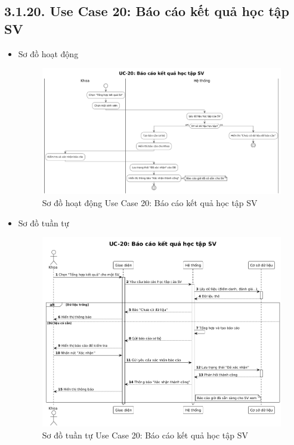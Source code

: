 \subsection*{3.1.20. Use Case 20: Báo cáo kết quả học tập SV}
\begin{itemize}
    \item Sơ đồ hoạt động
    \begin{figure}[H]
    \centering
    \includegraphics[scale=0.35 ]{Picture/ACUC20.png}
    \caption{Sơ đồ hoạt động Use Case 20: Báo cáo kết quả học tập SV}
    \end{figure}
    \item Sơ đồ tuần tự
    \begin{figure}[H]
    \centering
    \includegraphics[scale=0.4 ]{Picture/SEUC20.png}
    \caption{Sơ đồ tuần tự Use Case 20: Báo cáo kết quả học tập SV}
    \end{figure}
\end{itemize}
